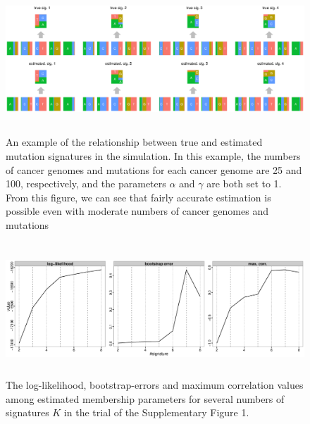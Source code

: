 \documentclass{article}
\begin{document}
% 
%
%
%
%





\clearpage

\begin{figure}
\centering
\includegraphics[width=15cm,height=5.5cm]{simulation_signature_example.eps}
\caption{An example of the relationship between true and estimated mutation signatures in the simulation.
In this example, the numbers of cancer genomes and mutations for each cancer genome are 25 and 100, respectively,
and the parameters $\alpha$ and $\gamma$ are both set to 1. 
From this figure, we can see that fairly accurate estimation is possible even with moderate numbers of cancer genomes and mutations}
\label{example_signature.pd}
\end{figure}


\clearpage

\begin{figure}
\centering
\includegraphics[width=15cm,height=5cm]{simulation_stat.eps}
\caption{The log-likelihood, bootstrap-errors and maximum correlation values among estimated membership parameters for several numbers of signatures $K$ in the trial of the Supplementary Figure 1.}
\label{example_summary.pd}
\end{figure}

\clearpage
\end{document}
